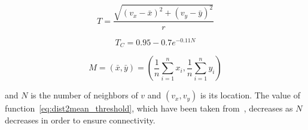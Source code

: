\begin{equation}
T = \dfrac{\sqrt{(v_x-\bar{x})^2 + (v_y-\bar{y})^2}}{r}
\end{equation}

\begin{equation}\label{eq:dist2mean_threshold}
T_C = 0.95 -0.7e^{-0.11N}
\end{equation}

\begin{equation}
M = (\bar{x},\bar{y}) = (\dfrac{1}{n}\sum_{i=1}^{n}x_i, \dfrac{1}{n}\sum_{i=1}^{n}y_i)
\end{equation}

and $N$ is the number of neighbors of $v$ and $(v_x, v_y)$ is its location.
The value of function~\ref{eq:dist2mean_threshold}, which have been taken from~\cite{Slavik2011}, decreases as $N$ decreases in order to ensure connectivity.
